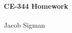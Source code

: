 \documentclass{article}
\begin{document}
    \thispagestyle{plain}
    {\LARGE{\noindent \bf CE-344 Homework\\\\}}
    {\Large{Jacob Sigman\\\\}}
    \tableofcontents
    \newpage
    
    
    
\end{document}
